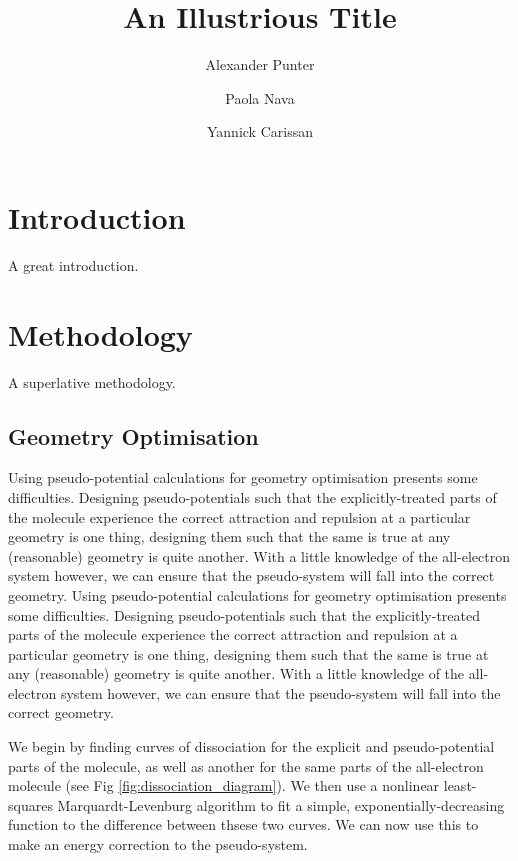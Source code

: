 \documentclass[aip,reprint]{revtex4-1}
\begin{document}
\title{An Illustrious Title}
\author{Alexander Punter}
\author{Paola Nava}
\author{Yannick Carissan}

\section{Introduction}

A great introduction.

\section{Methodology}

A superlative methodology.

\subsection*{\sffamily \large Geometry Optimisation}
\label{section:geometry_optimisation}		    		  
  Using pseudo-potential calculations for geometry optimisation presents some difficulties. Designing pseudo-potentials such that the explicitly-treated parts of the molecule experience the correct attraction and repulsion at a particular geometry is one thing, designing them such that the same is true at any (reasonable) geometry is quite another. With a little knowledge of the all-electron system however, we can ensure that the pseudo-system will fall into the correct geometry.		  Using pseudo-potential calculations for geometry optimisation presents some difficulties. Designing pseudo-potentials such that the explicitly-treated parts of the molecule experience the correct attraction and repulsion at a particular geometry is one thing, designing them such that the same is true at any (reasonable) geometry is quite another. With a little knowledge of the all-electron system however, we can ensure that the pseudo-system will fall into the correct geometry.
 		 
 We begin by finding curves of dissociation for the explicit and pseudo-potential parts of the molecule, as well as another for the same parts of the all-electron molecule (see Fig \ref{fig:dissociation_diagram}). We then use a nonlinear least-squares Marquardt-Levenburg algorithm to fit a simple, exponentially-decreasing function to the difference between thsese two curves. We can now use this to make an energy correction to the pseudo-system. 		 
  		  
\end{document}
